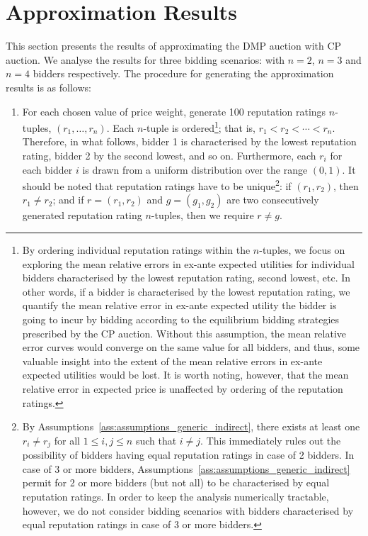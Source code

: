 \section{Approximation Results} %
\label{sec:approximation_results_approximation}
This section presents the results of approximating the DMP auction with CP auction. We analyse the results for three bidding scenarios: with $n=2$, $n=3$ and $n=4$ bidders respectively. The procedure for generating the approximation results is as follows:
\begin{enumerate}
\item For each chosen value of price weight, generate 100 reputation ratings $n$-tuples, $(r_1,\ldots, r_n)$. Each $n$-tuple is ordered\footnote{By ordering individual reputation ratings within the $n$-tuples, we focus on exploring the mean relative errors in ex-ante expected utilities for individual bidders characterised by the lowest reputation rating, second lowest, etc. In other words, if a bidder is characterised by the lowest reputation rating, we quantify the mean relative error in ex-ante expected utility the bidder is going to incur by bidding according to the equilibrium bidding strategies prescribed by the CP auction. Without this assumption, the mean relative error curves would converge on the same value for all bidders, and thus, some valuable insight into the extent of the mean relative errors in ex-ante expected utilities would be lost. It is worth noting, however, that the mean relative error in expected price is unaffected by ordering of the reputation ratings.}; that is, $r_1 < r_2 < \cdots < r_n$. Therefore, in what follows, bidder 1 is characterised by the lowest reputation rating, bidder 2 by the second lowest, and so on. Furthermore, each $r_i$ for each bidder $i$ is drawn from a uniform distribution over the range $(0,1)$. It should be noted that reputation ratings have to be unique\footnote{By Assumptions~\ref{ass:assumptions_generic_indirect}, there exists at least one $r_i\neq r_j$ for all $1\leq i,j\leq n$ such that $i\neq j$. This immediately rules out the possibility of bidders having equal reputation ratings in case of 2 bidders. In case of 3 or more bidders, Assumptions~\ref{ass:assumptions_generic_indirect} permit for 2 or more bidders (but not all) to be characterised by equal reputation ratings. In order to keep the analysis numerically tractable, however, we do not consider bidding scenarios with bidders characterised by equal reputation ratings in case of 3 or more bidders.}: if $(r_1,r_2)$, then $r_1\neq r_2$; and if $r=(r_1,r_2)$ and $g=(g_1,g_2)$ are two consecutively generated reputation rating $n$-tuples, then we require $r \neq g$.

\end{enumerate}
